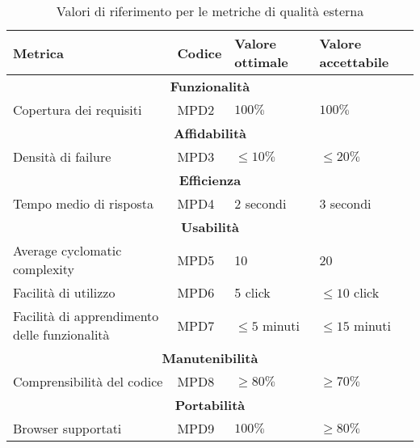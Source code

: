 \begin{table}[H]
    \centering
    \begin{tabularx}{\textwidth}{p{5.5cm}|X|l|l}
        \hline
        \textbf{Metrica} & \textbf{Codice}   & \textbf{Valore ottimale}  & \textbf{Valore accettabile}   \\
        \hline
        \multicolumn{4}{c}{\textbf{Funzionalità}} \\
        \hline
        Copertura dei requisiti & MPD2 &  $100\%$ & $100\%$    \\
        \hline
        \multicolumn{4}{c}{\textbf{Affidabilità}} \\
        \hline
        Densità di failure & MPD3 & $\le 10\%$ & $\le 20\% $ \\
        \hline
        \multicolumn{4}{c}{\textbf{Efficienza}} \\
        \hline
        Tempo medio di risposta & MPD4 & 2 secondi & 3 secondi \\
        \hline
        \multicolumn{4}{c}{\textbf{Usabilità}} \\
        \hline
        Average cyclomatic complexity & MPD5 & 10 & 20 \\
        Facilità di utilizzo & MPD6 & 5 click & $\le 10$ click \\
        Facilità di apprendimento delle funzionalità & MPD7 & $\le 5$ minuti & $\le 15$ minuti \\
        \hline
        \multicolumn{4}{c}{\textbf{Manutenibilità}} \\
        \hline
        Comprensibilità del codice & MPD8 & $\ge 80\%$ & $\ge 70\%$ \\
        \hline
        \multicolumn{4}{c}{\textbf{Portabilità}} \\
        \hline
        Browser supportati & MPD9 & $100\%$ & $\ge 80\%$ \\
        \hline
    \end{tabularx}
    \caption{Valori di riferimento per le metriche di qualità esterna}
\end{table}